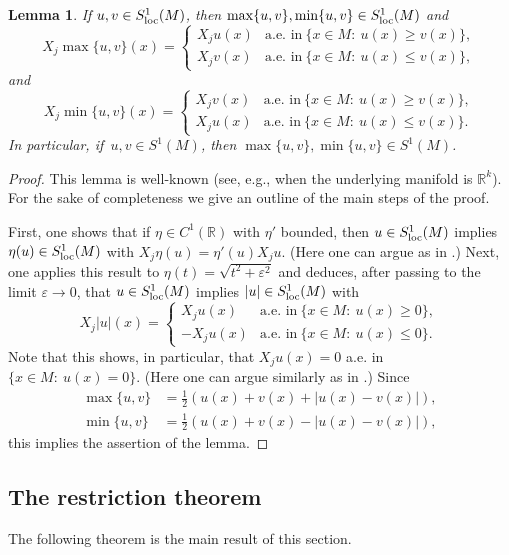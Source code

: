 \documentclass[JEP,XML,SOM,Unicode,published]{cedram}
\newcommand{\loc}{\textup{loc}}
\newtheorem{lemma}[theorem]{Lemma}
\theoremstyle{definition}
\let\epsilon\varepsilon
\newcommand{\1}{\mathbbm{1}}
\newcommand{\R}{\mathbb{R}}
\begin{document}
\begin{lemma}\label{truncation}
If $u,v\in S^1_\loc(M)$, then $\max\{u,v\}, \min\{u,v\}\in S^1_\loc(M)$ and
\[
X_j \max\{u,v\}(x) = \begin{cases}
X_j u(x) & \text{a.e.\ in}\ \{ x\in M:\ u(x)\geq v(x)\},\\
X_jv(x) & \text{a.e.\ in}\ \{ x\in M:\ u(x)\leq v(x)\},
\end{cases}
\]
and
\[
X_j \min\{u,v\}(x) = \begin{cases}
X_j v(x) & \text{a.e.\ in}\ \{ x \in M:\ u(x)\geq v(x) \},\\
X_ju(x) & \text{a.e.\ in}\ \{ x \in M:\ u(x)\leq v(x) \}.
\end{cases}
\]
In particular, if~$u,v\in S^1(M)$, then $\max\{u,v\}, \min\{u,v\}\in S^1(M)$.
\end{lemma}

\begin{proof}
This lemma is well-known (see, e.g., \cite[Lem.\,3.5]{GaNh} when the underlying manifold is $\R^k$). For the sake of completeness we give an outline of the main steps of the proof.

First, one shows that if $\eta\in C^1(\R)$ with $\eta'$ bounded, then $u\in S^1_\loc(M)$ implies $\eta(u)\in S^1_\loc(M)$ with $X_j\eta(u) = \eta'(u)X_j u$. (Here one can argue as in \cite[Th.\,1.18]{HeKiMa}.) Next, one applies this result to $\eta(t)=\sqrt{t^2+\epsilon^2}$ and deduces, after passing to the limit $\epsilon\to 0$, that $u\in S^1_\loc(M)$ implies $|u|\in S^1_\loc(M)$ with
\[
X_j|u|(x) =
\begin{cases}
X_j u(x) & \text{a.e.\ in}\ \{ x\in M:\ u(x)\geq 0\},\\
- X_ju(x) & \text{a.e.\ in}\ \{ x\in M:\ u(x)\leq 0 \}.
\end{cases}
\]
Note that this shows, in particular, that $X_j u(x)=0$ a.e. in $\{x\in M:\ u(x)=0\}$. (Here one can argue similarly as in \cite[Lem.\,1.19]{HeKiMa}.) Since
\begin{align*}
\max\{u,v\} & = \tfrac12(u(x)+v(x) + |u(x)-v(x)|), \\
\min\{u,v\} & = \tfrac12(u(x)+v(x) - |u(x)-v(x)|),
\end{align*}
this implies the assertion of the lemma.
\end{proof}

\subsection{The restriction theorem}
The following theorem is the main result of this section.
\end{document}
